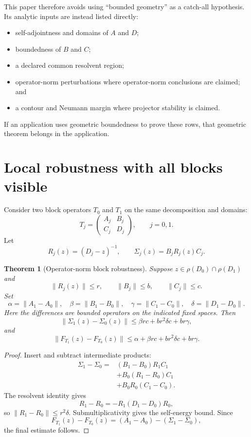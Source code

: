 \documentclass[11pt]{article}
\newtheorem{theorem}{Theorem}[section]
\theoremstyle{definition}
\theoremstyle{remark}
\newcommand{\1}{\mathbf 1}
\begin{document}
This paper therefore avoids using ``bounded geometry'' as a catch-all
hypothesis.  Its analytic inputs are instead listed directly:
\begin{itemize}[leftmargin=2em]
\item self-adjointness and domains of \(A\) and \(D\);
\item boundedness of \(B\) and \(C\);
\item a declared common resolvent region;
\item operator-norm perturbations where operator-norm conclusions are
      claimed; and
\item a contour and Neumann margin where projector stability is claimed.
\end{itemize}
If an application uses geometric boundedness to prove these rows, that
geometric theorem belongs in the application.

\section{Local robustness with all blocks visible}
\label{sec:robust}

Consider two block operators \(T_0\) and \(T_1\) on the same decomposition
and domains:
\[
T_j=
\begin{pmatrix}
A_j&B_j\\ C_j&D_j
\end{pmatrix},
\qquad j=0,1.
\]
Let
\[
 R_j(z)=(D_j-z)^{-1},
 \qquad
 \Sigma_j(z)=B_jR_j(z)C_j.
\]

\begin{theorem}[Operator-norm block robustness]
\label{thm:robust}
Suppose \(z\in\rho(D_0)\cap\rho(D_1)\) and
\[
\|R_j(z)\|\leq r,\qquad
\|B_j\|\leq b,\qquad
\|C_j\|\leq c.
\]
Set
\[
\alpha=\|A_1-A_0\|,\quad
\beta=\|B_1-B_0\|,\quad
\gamma=\|C_1-C_0\|,\quad
\delta=\|D_1-D_0\|.
\]
Here the differences are bounded operators on the indicated fixed
spaces.  Then
\[
\|\Sigma_1(z)-\Sigma_0(z)\|
\leq
\beta r c
+b r^2\delta c
+b r\gamma,
\]
and
\[
\|F_{T_1}(z)-F_{T_0}(z)\|
\leq
\alpha+\beta r c+b r^2\delta c+b r\gamma.
\]
\end{theorem}

\begin{proof}
Insert and subtract intermediate products:
\[
\begin{aligned}
\Sigma_1-\Sigma_0
={}&(B_1-B_0)R_1C_1\\
&+B_0(R_1-R_0)C_1\\
&+B_0R_0(C_1-C_0).
\end{aligned}
\]
The resolvent identity gives
\[
  R_1-R_0=-R_1(D_1-D_0)R_0,
\]
so \(\|R_1-R_0\|\leq r^2\delta\).  Submultiplicativity gives the
self-energy bound.  Since
\[
F_{T_1}(z)-F_{T_0}(z)
=(A_1-A_0)-(\Sigma_1-\Sigma_0),
\]
the final estimate follows.
\end{proof}
\end{document}
